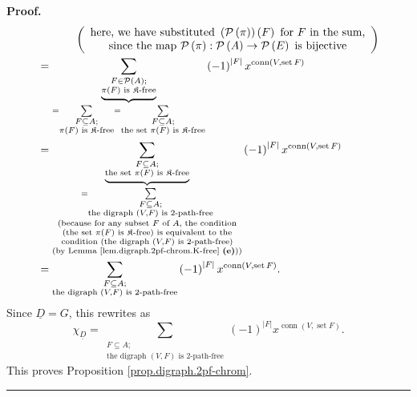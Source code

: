 \documentclass[numbers=enddot,12pt,final,onecolumn,notitlepage]{scrartcl}%
\theoremstyle{definition}
\newenvironment{proof}[1][Proof]{\noindent\textbf{#1.} }{\ \rule{0.5em}{0.5em}}
\newenvironment{verlong}{}{}
\let\sumnonlimits\sum
\renewcommand{\sum}{\sumnonlimits\limits}
\begin{document}
\begin{verlong}
\begin{proof}
\begin{align*}
&  \ \ \ \ \ \ \ \ \ \ \left(
\begin{array}
[c]{c}%
\text{here, we have substituted }\left(  \mathcal{P}\left(  \pi\right)
\right)  \left(  F\right)  \text{ for }F\text{ in the sum,}\\
\text{since the map }\mathcal{P}\left(  \pi\right)  :\mathcal{P}\left(
A\right)  \rightarrow\mathcal{P}\left(  E\right)  \text{ is bijective}%
\end{array}
\right) \\
&  =\underbrace{\sum_{\substack{F\in\mathcal{P}\left(  A\right)  ;\\\pi\left(
F\right)  \text{ is }\mathfrak{K}\text{-free}}}}_{=\sum_{\substack{F\subseteq
A;\\\pi\left(  F\right)  \text{ is }\mathfrak{K}\text{-free}}}=\sum
_{\substack{F\subseteq A;\\\text{the set }\pi\left(  F\right)  \text{ is
}\mathfrak{K}\text{-free}}}}\left(  -1\right)  ^{\left\vert F\right\vert
}x^{\operatorname*{conn}\left(  V,\operatorname*{set}F\right)  }\\
&  =\underbrace{\sum_{\substack{F\subseteq A;\\\text{the set }\pi\left(
F\right)  \text{ is }\mathfrak{K}\text{-free}}}}_{\substack{=\sum
_{\substack{F\subseteq A;\\\text{the digraph }\left(  V,F\right)  \text{ is
}2\text{-path-free}}}\\\text{(because for any subset }F\text{ of }A\text{, the
condition}\\\left(  \text{the set }\pi\left(  F\right)  \text{ is
}\mathfrak{K}\text{-free}\right)  \text{ is equivalent to the}%
\\\text{condition }\left(  \text{the digraph }\left(  V,F\right)  \text{ is
}2\text{-path-free}\right)  \\\text{(by Lemma
\ref{lem.digraph.2pf-chrom.K-free} \textbf{(e)}))}}}\left(  -1\right)
^{\left\vert F\right\vert }x^{\operatorname*{conn}\left(
V,\operatorname*{set}F\right)  }\\
&  =\sum_{\substack{F\subseteq A;\\\text{the digraph }\left(  V,F\right)
\text{ is }2\text{-path-free}}}\left(  -1\right)  ^{\left\vert F\right\vert
}x^{\operatorname*{conn}\left(  V,\operatorname*{set}F\right)  }.
\end{align*}
Since $\underline{D}=G$, this rewrites as
\[
\chi_{\underline{D}}=\sum_{\substack{F\subseteq A;\\\text{the digraph }\left(
V,F\right)  \text{ is }2\text{-path-free}}}\left(  -1\right)  ^{\left\vert
F\right\vert }x^{\operatorname*{conn}\left(  V,\operatorname*{set}F\right)
}.
\]
This proves Proposition \ref{prop.digraph.2pf-chrom}.
\end{proof}
\end{verlong}
\end{document}

